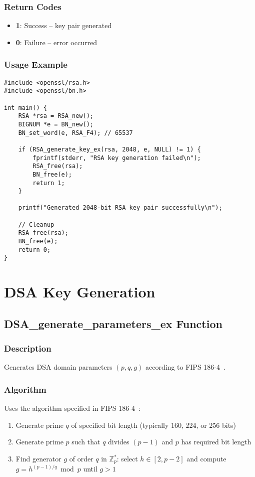 \subsubsection{Return Codes}
\begin{itemize}
    \item \textbf{1}: Success -- key pair generated
    \item \textbf{0}: Failure -- error occurred
\end{itemize}

\subsubsection{Usage Example}
\begin{verbatim}
#include <openssl/rsa.h>
#include <openssl/bn.h>

int main() {
    RSA *rsa = RSA_new();
    BIGNUM *e = BN_new();
    BN_set_word(e, RSA_F4); // 65537
    
    if (RSA_generate_key_ex(rsa, 2048, e, NULL) != 1) {
        fprintf(stderr, "RSA key generation failed\n");
        RSA_free(rsa);
        BN_free(e);
        return 1;
    }
    
    printf("Generated 2048-bit RSA key pair successfully\n");
    
    // Cleanup
    RSA_free(rsa);
    BN_free(e);
    return 0;
}
\end{verbatim}

\section{DSA Key Generation}

\subsection{DSA\_generate\_parameters\_ex Function}

\subsubsection{Description}
Generates DSA domain parameters $(p, q, g)$ according to FIPS 186-4~\cite{fips186}.

\subsubsection{Algorithm}
Uses the algorithm specified in FIPS 186-4~\cite{fips186}:
\begin{enumerate}
    \item Generate prime $q$ of specified bit length (typically 160, 224, or 256 bits)
    \item Generate prime $p$ such that $q$ divides $(p-1)$ and $p$ has required bit length
    \item Find generator $g$ of order $q$ in $\mathbb{Z}_p^*$: select $h \in [2, p-2]$ and compute $g = h^{(p-1)/q} \bmod p$ until $g > 1$
\end{enumerate}

